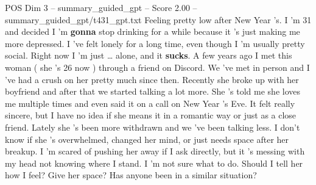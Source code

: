 \begin{textsample}{POS Dim 3 – summary\_guided\_gpt – Score 2.00 – summary\_guided\_gpt/t431\_gpt.txt}  \label{ex:f3_pos_023}
Feeling pretty low after New Year ’s.
I ’m 31 and decided I ’m \textbf{gonna} stop drinking for a while because it ’s just making me more depressed.
I ’ve felt lonely for a long time, even though I ’m usually pretty social.
Right now I ’m just … alone, and it \textbf{sucks}.
A few years ago I met this woman ( she ’s 26 now ) through a friend on Discord.
We ’ve met in person and I ’ve had a crush on her pretty much since then.
Recently she broke up with her boyfriend and after that we started talking a lot more.
She ’s told me she loves me multiple times and even said it on a call on New Year ’s Eve.
It felt really sincere, but I have no idea if she means it in a romantic way or just as a close friend.
Lately she ’s been more withdrawn and we ’ve been talking less.
I don't know if she ’s overwhelmed, changed her mind, or just needs space after her breakup.
I ’m scared of pushing her away if I ask directly, but it ’s messing with my head not knowing where I stand.
I ’m not sure what to do.
Should I tell her how I feel?
Give her space?
Has anyone been in a similar situation?

\end{textsample}
